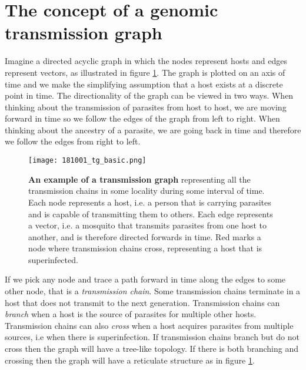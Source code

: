 \documentclass[_main.tex]{subfiles}
\begin{document}

\section*{The concept of a genomic transmission graph}

Imagine a directed acyclic graph in which the nodes represent hosts and edges represent vectors, as illustrated in figure \ref{fig:main_graph_1}.  The graph is plotted on an axis of time and we make the simplifying assumption that a host exists at a discrete point in time.  The directionality of the graph can be viewed in two ways.  When thinking about the transmission of parasites from host to host, we are moving forward in time so we follow the edges of the graph from left to right.  When thinking about the ancestry of a parasite, we are going back in time and therefore we follow the edges from right to left. 


\begin{figure}[h!]
\centering
\texttt{[image: 181001\_tg\_basic.png]}
\caption{\textbf{An example of a transmission graph} representing all the transmission chains in some locality during some interval of time. Each node represents a host, i.e. a person that is carrying parasites and is capable of transmitting them to others.  Each edge represents a vector, i.e. a mosquito that transmits parasites from one host to another, and is therefore directed forwards in time. Red marks a node where transmission chains cross, representing a host that is superinfected.}
\label{fig:main_graph_1}
\end{figure}

If we pick any node and trace a path forward in time along the edges to some other node, that is a \textit{transmission chain}. Some transmission chains terminate in a host that does not transmit to the next generation. Transmission chains can \textit{branch} when a host is the source of parasites for multiple other hosts.  Transmission chains can also \textit{cross} when a host acquires parasites from multiple sources, i.e when there is superinfection.   If transmission chains branch but do not cross then the graph will have a tree-like topology.  If there is both branching and crossing then the graph will have a reticulate structure as in figure \ref{fig:main_graph_1}.
\end{document}

